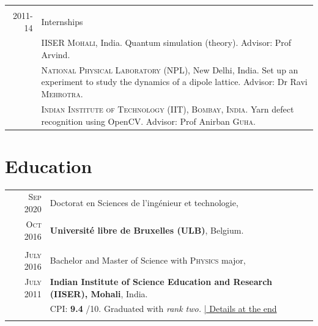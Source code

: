 \documentclass[a4paper,10pt]{article}
\begin{document}
\begin{longtable}{r|p{11cm}}
\multicolumn{2}{c}{} \\

\textsc{2011-14}  & Internships \\
                      &\textsc{IISER Mohali}, India. {\footnotesize Quantum simulation (theory).} 
                      {\footnotesize Advisor:} \small{Prof Arvind}.\\
                      &\textsc{National Physical Laboratory (NPL)}, New Delhi, India. {\footnotesize Set up an experiment to study the dynamics of a dipole lattice.}                    
                      {\footnotesize Advisor:} \small{Dr Ravi \textsc{Mehrotra}}.\\
                      &\textsc{Indian Institute of Technology (IIT), Bombay, India.} {\footnotesize Yarn defect recognition using OpenCV.}  
                      {\footnotesize Advisor:} \small{Prof Anirban \textsc{Guha}}.
\end{longtable}

\section{Education}
\begin{tabular}{rp{11cm}}	
  \textsc{Sep} 2020 & Doctorat en Sciences de l'ingénieur et technologie,\\
 \textsc{Oct} 2016  & \textbf{Université libre de Bruxelles (ULB)}, Belgium.\\
                    & \\
 \textsc{July} 2016 & Bachelor and Master of Science with \textsc{Physics} major,\\
 \textsc{July} 2011 & \textbf{Indian Institute of Science Education and Research (IISER), Mohali}, India.\\
& CPI: \textbf{9.4} /10. \small Graduated with \emph{rank two.} \hyperlink{grades}{\hfill | \footnotesize Details at the end}\\&\\ 
\end{tabular}
\end{document}

